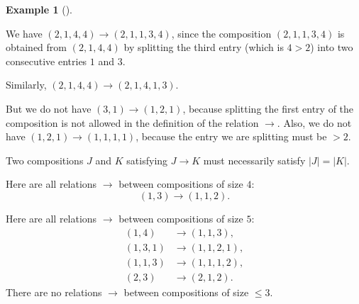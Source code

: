\documentclass[numbers=enddot,12pt,final,onecolumn,notitlepage]{scrartcl}%
\theoremstyle{definition}
\newtheorem{exmp}[theo]{Example}
\newenvironment{example}[1][]
{\begin{exmp}[#1]\begin{leftbar}}
{\end{leftbar}\end{exmp}}
\begin{document}
\begin{example}
We have $\left(  2,1,4,4\right)  \rightarrow\left(  2,1,1,3,4\right)  $, since
the composition $\left(  2,1,1,3,4\right)  $ is obtained from $\left(
2,1,4,4\right)  $ by splitting the third entry (which is $4>2$) into two
consecutive entries $1$ and $3$.

Similarly, $\left(  2,1,4,4\right)  \rightarrow\left(  2,1,4,1,3\right)  $.

But we do not have $\left(  3,1\right)  \rightarrow\left(  1,2,1\right)  $,
because splitting the first entry of the composition is not allowed in the
definition of the relation $\rightarrow$. Also, we do not have $\left(
1,2,1\right)  \rightarrow\left(  1,1,1,1\right)  $, because the entry we are
splitting must be $>2$.

Two compositions $J$ and $K$ satisfying $J\rightarrow K$ must necessarily
satisfy $\left\vert J\right\vert =\left\vert K\right\vert $.

Here are all relations $\rightarrow$ between compositions of size $4$:%
\[
\left(  1,3\right)  \rightarrow\left(  1,1,2\right)  .
\]


Here are all relations $\rightarrow$ between compositions of size $5$:%
\begin{align*}
\left(  1,4\right)   &  \rightarrow\left(  1,1,3\right)  ,\\
\left(  1,3,1\right)   &  \rightarrow\left(  1,1,2,1\right)  ,\\
\left(  1,1,3\right)   &  \rightarrow\left(  1,1,1,2\right)  ,\\
\left(  2,3\right)   &  \rightarrow\left(  2,1,2\right)  .
\end{align*}
There are no relations $\rightarrow$ between compositions of size $\leq3$.
\end{example}
\end{document}
